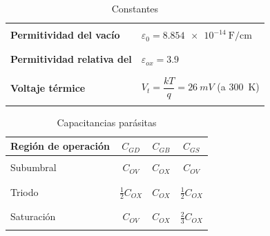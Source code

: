 \documentclass[11pt]{article}
\begin{document}
	\begin{table}
		\centering
		\begin{tabular}{|l|l|}
			\hline
			&\\
			\textbf{Permitividad del vacío} & $\varepsilon_0 = \SI{8.854e-14}{\farad\per\centi\meter}$ \\
			&\\
			\hline
			&\\
			\textbf{Permitividad relativa del \ch{SiO2}} & $\varepsilon_{ox} = \num{3.9}$ \\
			&\\
			\hline
			&\\
			\textbf{Voltaje térmice} & $V_t = \dfrac{kT}{q} = \SI{26}{mV}$ (a \SI{300}{K}) \\
			&\\
			\hline
		\end{tabular}
		\caption{Constantes}
	\end{table}

	\begin{table}[h]
		\centering
		\begin{tabular}{|l|c|c|c|}
			\hline
			Región de operación & $C_{GD}$ & $C_{GB}$ & $C_{GS}$ \\
			\hline
			&&&\\
			Subumbral & $C_{OV}$ & $C_{OX}$ & $C_{OV}$ \\
			&&&\\
			\hline
			&&&\\
			Triodo & $\frac{1}{2}C_{OX}$ & $C_{OX}$ & $\frac{1}{2}C_{OX}$ \\
			&&&\\
			\hline
			&&&\\
			Saturación & $C_{OV}$ & $C_{OX}$ & $\frac{2}{3}C_{OX}$ \\
			&&&\\
			\hline
		\end{tabular}
		\caption{Capacitancias parásitas }
	\end{table}
\end{document}
